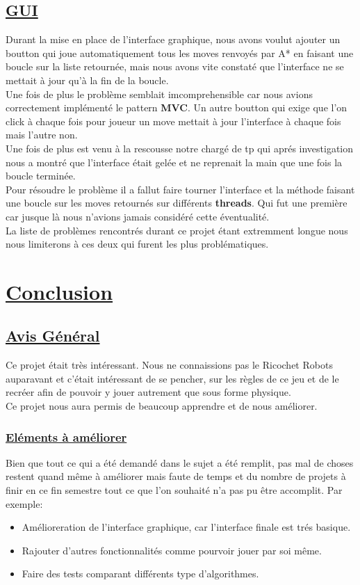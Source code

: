 \documentclass[12pt]{article}
\begin{document}
	\subsection{\underline{GUI}}
	Durant la mise en place de l'interface graphique, nous avons voulut ajouter un boutton qui joue automatiquement tous les moves
	renvoyés par A* en faisant une boucle sur la liste retournée, mais nous avons vite constaté que l'interface ne se mettait à jour qu'à la fin 
	de la boucle.\\
	Une fois de plus le problème semblait imcomprehensible car nous avions correctement implémenté le pattern \textbf{MVC}. Un autre boutton
	qui exige que l'on click à chaque fois pour joueur un move mettait à jour l'interface à chaque fois mais l'autre non.\\
	Une fois de plus est venu à la rescousse notre chargé de tp qui aprés investigation nous a montré que l'interface était gelée et ne reprenait 
	la main que une fois la boucle terminée.\\
	Pour résoudre le problème il a fallut faire tourner l'interface et la méthode faisant une boucle sur les moves retournés sur différents 
	\textbf{threads}. Qui fut une première car jusque là nous n'avions jamais considéré cette éventualité.\\
	La liste de problèmes rencontrés durant ce projet étant extremment longue nous nous limiterons à ces deux qui furent les plus problématiques.
	
	\newpage
	\section{\underline{Conclusion}}
	\subsection{\underline{Avis Général}}
	Ce projet était très intéressant. Nous ne connaissions pas le Ricochet Robots auparavant et c'était intéressant de se pencher, 
	sur les règles de ce jeu et de le recréer afin de pouvoir y jouer autrement que sous forme physique.\\
	Ce projet nous aura permis de beaucoup apprendre et de nous améliorer.
	
	\subsubsection{\underline{Eléments à améliorer}}
	Bien que tout ce qui a été demandé dans le sujet a été remplit, pas mal de choses restent quand même à améliorer mais faute de 
	temps et du nombre de projets à finir en ce fin semestre tout ce que l'on souhaité n'a pas pu être accomplit.
	Par exemple:
	\begin{itemize}
		\item Amélioreration de  l'interface graphique, car l'interface finale est trés basique.
		\item Rajouter d'autres fonctionnalités comme pourvoir jouer par soi même.
		\item Faire des tests comparant différents type d'algorithmes.
	\end{itemize}

	\newpage


\end{document}
